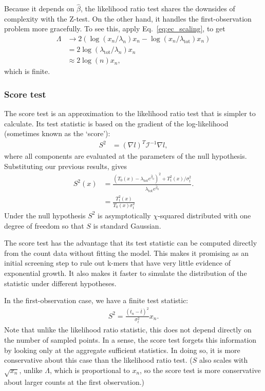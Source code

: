 \documentclass[12pt, letterpaper]{article}
\newcommand{ \lambtot }{\lambda_{\text{tot}}}
\begin{document}
Because it depends on $\hat{\beta}$, the likelihood ratio test shares the downsides of complexity with the Z-test.
On the other hand, it handles the first-observation problem more gracefully.
To see this, apply Eq.~\ref{eq:ec_scaling}, to get
\begin{align}
    \Lambda & \to 2 \left( \log(x_n / \lambda_n) x_n - \log(x_n / \lambtot) x_n \right) \\
            & = 2 \log(\lambtot / \lambda_n) x_n \\
            & \approx 2 \log(n) x_n,
\end{align}
which is finite.

\subsubsection{Score test}

The score test is an approximation to the likelihood ratio test that is simpler to calculate.
Its test statistic is based on the gradient of the log-likelihood (sometimes known as the `score'):
\begin{align}
    S^2 & = {(\nabla l)}^T \mathcal{I}^{-1} \nabla l,
\end{align}
where all components are evaluated at the parameters of the null hypothesis.
Substituting our previous results, gives
\begin{align}
    S^2(x) & = \frac{{(T_0(x) - \lambtot e^{\hat{\beta}_0})}^2 + T_1^2(x) / \sigma_t^2}{\lambtot e^{\hat{\beta}_0}}. \\
           & = \frac{T_1^2(x)}{T_0(x) \sigma_t^2}
\end{align}
Under the null hypothesis $S^2$ is asymptotically $\chi$-squared distributed with one degree of freedom so that $S$ is standard Gaussian.

The score test has the advantage that its test statistic can be computed directly from the count data without fitting the model.
This makes it promising as an initial screening step to rule out k-mers that have very little evidence of exponential growth.
It also makes it faster to simulate the distribution of the statistic under different hypotheses.

In the first-observation case, we have a finite test statistic:
\begin{align}
    S^2 = \frac{{(t_n - \bar{t})}^2}{\sigma_t^2} x_n.
\end{align}
Note that unlike the likelihood ratio statistic, this does not depend directly on the number of sampled points.
In a sense, the score test forgets this information by looking only at the aggregate sufficient statistics.
In doing so, it is more conservative about this case than the likelihood ratio test.
($S$ also scales with $\sqrt{x_n}$, unlike $\Lambda$, which is proportional to $x_n$, so the score test is more conservative about larger counts at the first observation.)
\end{document}
